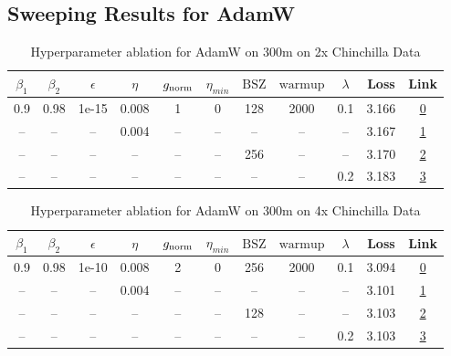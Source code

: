\subsection{Sweeping Results for AdamW}%
\begin{table}[H]
\centering
\caption{Hyperparameter ablation for AdamW on 300m on 2x Chinchilla Data}
\label{tab:ablation_adamw_300m_on_2x_chinchilla_data}
\begin{tabular}{ccccccccccc}
\toprule
$\beta_1$ & $\beta_2$ & $\epsilon$ & $\eta$ & $g_{\mathrm{norm}}$ & $\eta_{min}$ & $\mathrm{BSZ}$ & $\mathrm{warmup}$ & $\lambda$ & Loss & Link \\
\midrule
0.9 & 0.98 & 1e-15 & 0.008 & 1 & 0 & 128 & 2000 & 0.1 & 3.166 & \href{https://wandb.ai/marin-community/optimizer-scaling/runs/sweep-300m-12B-adamwbd209alr0.008-wd0.1-minlr0.0-warmup2000-b10.-25750f}{0} \\
\midrule
-- & -- & -- & 0.004 & -- & -- & -- & -- & -- & 3.167 & \href{https://wandb.ai/marin-community/optimizer-scaling/runs/sweep-300m-12B-adamw065712lr0.004-wd0.1-minlr0.0-warmup2000-b10.-593504}{1} \\
-- & -- & -- & -- & -- & -- & 256 & -- & -- & 3.170 & \href{https://wandb.ai/marin-community/optimizer-scaling/runs/sweep-300m-12B-adamwdef996lr0.008-wd0.1-minlr0.0-warmup2000-b10.-75d2a3}{2} \\
-- & -- & -- & -- & -- & -- & -- & -- & 0.2 & 3.183 & \href{https://wandb.ai/marin-community/optimizer-scaling/runs/sweep-300m-12B-adamwb1b055lr0.008-wd0.2-minlr0.0-warmup2000-b10.-63e273}{3} \\
\bottomrule
\end{tabular}
\end{table}

\begin{table}[H]
\centering
\caption{Hyperparameter ablation for AdamW on 300m on 4x Chinchilla Data}
\label{tab:ablation_adamw_300m_on_4x_chinchilla_data}
\begin{tabular}{ccccccccccc}
\toprule
$\beta_1$ & $\beta_2$ & $\epsilon$ & $\eta$ & $g_{\mathrm{norm}}$ & $\eta_{min}$ & $\mathrm{BSZ}$ & $\mathrm{warmup}$ & $\lambda$ & Loss & Link \\
\midrule
0.9 & 0.98 & 1e-10 & 0.008 & 2 & 0 & 256 & 2000 & 0.1 & 3.094 & \href{https://wandb.ai/marin-community/optimizer-scaling/runs/sweep-300m-24B-adamw5dcabdlr0.008-wd0.1-minlr0-warmup2000-b10.9--5e75fb}{0} \\
\midrule
-- & -- & -- & 0.004 & -- & -- & -- & -- & -- & 3.101 & \href{https://wandb.ai/marin-community/optimizer-scaling/runs/sweep-300m-24B-adamwae7cf4lr0.004-wd0.1-minlr0-warmup2000-b10.9--ee3fd2}{1} \\
-- & -- & -- & -- & -- & -- & 128 & -- & -- & 3.103 & \href{https://wandb.ai/marin-community/optimizer-scaling/runs/sweep-300m-24B-adamw07fc6elr0.008-wd0.1-minlr0-warmup2000-b10.9--459481}{2} \\
-- & -- & -- & -- & -- & -- & -- & -- & 0.2 & 3.103 & \href{https://wandb.ai/marin-community/optimizer-scaling/runs/sweep-300m-24B-adamw4476fflr0.008-wd0.2-minlr0-warmup2000-b10.9--1eec01}{3} \\
\bottomrule
\end{tabular}
\end{table}

